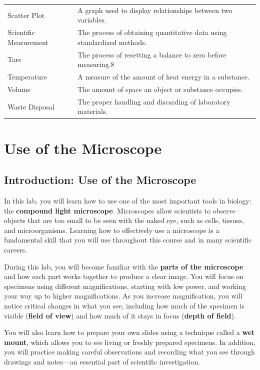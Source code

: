 \documentclass[
  letterpaper,
  DIV=11,
  numbers=noendperiod]{scrreprt}
\begin{document}
{\begin{longtable}[]{@{}
  >{\raggedright\arraybackslash}p{}
  >{\raggedright\arraybackslash}p{}@{}}
Scatter Plot & A graph used to display relationships between two
variables. \\
Scientific Measurement & The process of obtaining quantitative data
using standardized methods. \\
Tare & The process of resetting a balance to zero before measuring.8 \\
Temperature & A measure of the amount of heat energy in a substance. \\
Volume & The amount of space an object or substance occupies. \\
Waste Disposal & The proper handling and discarding of laboratory
materials. \\
\end{longtable}
}


\chapter{\texorpdfstring{\textbf{Use of the
Microscope}}{Use of the Microscope}}\label{use-of-the-microscope}

\section{\texorpdfstring{\textbf{Introduction: Use of the
Microscope}}{Introduction: Use of the Microscope}}\label{introduction-use-of-the-microscope}

In this lab, you will learn how to use one of the most important tools
in biology: the \textbf{compound light microscope}. Microscopes allow
scientists to observe objects that are too small to be seen with the
naked eye, such as cells, tissues, and microorganisms. Learning how to
effectively use a microscope is a fundamental skill that you will use
throughout this course and in many scientific careers.

During this lab, you will become familiar with the \textbf{parts of the
microscope} and how each part works together to produce a clear image.
You will focus on specimens using different magnifications, starting
with low power, and working your way up to higher magnifications. As you
increase magnification, you will notice critical changes in what you
see, including how much of the specimen is visible (\textbf{field of
view}) and how much of it stays in focus (\textbf{depth of field}).

You will also learn how to prepare your own slides using a technique
called a \textbf{wet mount}, which allows you to see living or freshly
prepared specimens. In addition, you will practice making careful
observations and recording what you see through drawings and notes---an
essential part of scientific investigation.
\end{document}
